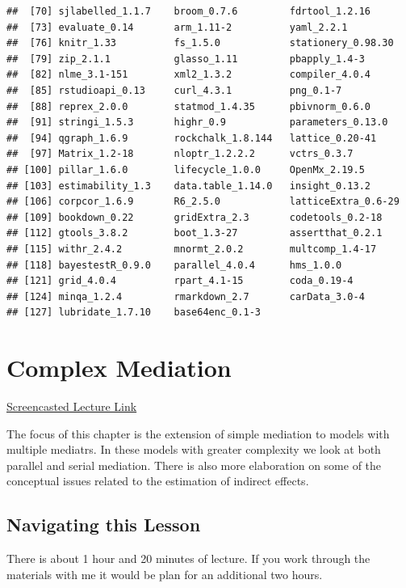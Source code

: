 \documentclass[
  english,
]{book}
\begin{document}
\begin{verbatim}
##  [70] sjlabelled_1.1.7    broom_0.7.6         fdrtool_1.2.16     
##  [73] evaluate_0.14       arm_1.11-2          yaml_2.2.1         
##  [76] knitr_1.33          fs_1.5.0            stationery_0.98.30 
##  [79] zip_2.1.1           glasso_1.11         pbapply_1.4-3      
##  [82] nlme_3.1-151        xml2_1.3.2          compiler_4.0.4     
##  [85] rstudioapi_0.13     curl_4.3.1          png_0.1-7          
##  [88] reprex_2.0.0        statmod_1.4.35      pbivnorm_0.6.0     
##  [91] stringi_1.5.3       highr_0.9           parameters_0.13.0  
##  [94] qgraph_1.6.9        rockchalk_1.8.144   lattice_0.20-41    
##  [97] Matrix_1.2-18       nloptr_1.2.2.2      vctrs_0.3.7        
## [100] pillar_1.6.0        lifecycle_1.0.0     OpenMx_2.19.5      
## [103] estimability_1.3    data.table_1.14.0   insight_0.13.2     
## [106] corpcor_1.6.9       R6_2.5.0            latticeExtra_0.6-29
## [109] bookdown_0.22       gridExtra_2.3       codetools_0.2-18   
## [112] gtools_3.8.2        boot_1.3-27         assertthat_0.2.1   
## [115] withr_2.4.2         mnormt_2.0.2        multcomp_1.4-17    
## [118] bayestestR_0.9.0    parallel_4.0.4      hms_1.0.0          
## [121] grid_4.0.4          rpart_4.1-15        coda_0.19-4        
## [124] minqa_1.2.4         rmarkdown_2.7       carData_3.0-4      
## [127] lubridate_1.7.10    base64enc_0.1-3
\end{verbatim}

\hypertarget{CompMed}{%
\chapter{Complex Mediation}\label{CompMed}}

\href{https://spu.hosted.panopto.com/Panopto/Pages/Viewer.aspx?pid=6991fd3d-22b6-44f5-ab5b-ad1000314b7f}{Screencasted Lecture Link}

The focus of this chapter is the extension of simple mediation to models with multiple mediatrs. In these models with greater complexity we look at both parallel and serial mediation. There is also more elaboration on some of the conceptual issues related to the estimation of indirect effects.

\hypertarget{navigating-this-lesson-5}{%
\section{Navigating this Lesson}\label{navigating-this-lesson-5}}

There is about 1 hour and 20 minutes of lecture. If you work through the materials with me it would be plan for an additional two hours.
\end{document}
